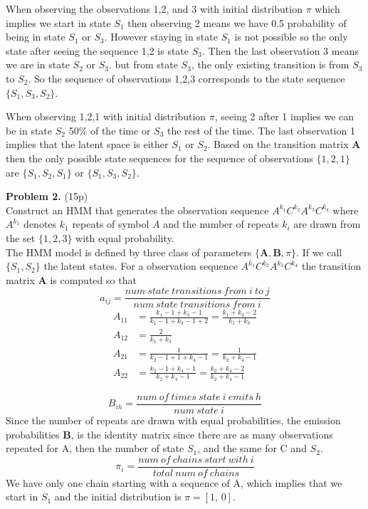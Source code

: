 \documentclass[12pt]{article}
\newcommand{\matr}[1]{\bm{#1}}
\begin{document}
When observing the observations 1,2, and 3 with initial distribution $\pi$ which implies we start in state $S_1$ then observing 2 means we have 0.5 probability of being in state $S_1$ or $S_3$.
However staying in state $S_1$ is not possible so the only state after seeing the sequence 1,2 is state $S_3$. Then the last observation 3 means we are in state $S_2$ or $S_3$. but from state $S_3$, 
the only existing transition is from $S_3$ to $S_2$. So the sequence of observations 1,2,3 corresponds to the state sequence $\{S_1, S_3, S_2 \}$.

When observing 1,2,1 with initial distribution $\pi$, seeing 2 after 1 implies we can be in state $S_2$ 50\% of the time or $S_3$ the rest of the time. The last observation 1 implies that the latent space is either $S_1$ or $S_2$.
Based on the transition matrix $\matr{A}$ then the only possible state sequences for the sequence of observations $\{1,2,1\}$ are $\{S_1, S_2, S_1\}$ or  $\{S_1, S_3, S_2\}$.

\noindent \textbf{Problem 2.} (15p)\\
Construct an HMM that generates the observation sequence $A^{k_1}C^{k_2}A^{k_3}C^{k_4}$ where $A^{k_1}$ denotes $k_1$ repeats of symbol $A$ and the number of repeats $k_i$ are drawn from the set $\{1,2,3\}$ with equal probability.\\

The HMM model is defined by three class of parameters $\{\matr{A}, \matr{B}, \pi \}$.
If we call $\{S_1, S_2\}$ the latent states.  For a observation sequence $A^{k_1}C^{k_2}A^{k_3}C^{k_4}$ the transition matrix $\matr{A}$ is computed so that $$a_{ij} = \frac{num\ state\ transitions\ from\ i\ to\ j}{num\ state\ transitions\ from\ i}$$
\begin{align*}
	A_{11} &= \frac{k_1 -1 + k_3 -1} {k_1-1 + k_3-1 +2} = \frac{k_1 + k_3 -2} {k_1 + k_3} \\
	A_{12} &= \frac{2}{k_1 + k_3} \\
	A_{21} &= \frac{1}{k_2-1 + 1 + k_4-1} = \frac{1} {k_2 + k_4 -1}\\
	A_{22} &= \frac{k_2-1 + k_4-1}{k_2 + k_4 -1} = \frac{k_2 + k_4 -2} {k_2 + k_4 -1}
\end{align*}

$$B_{ih}=\frac{num\ of\ times\ state\ i\ emits\ h}{num\ state\ i}$$
Since the number of repeats are drawn with equal probabilities, the emission probabilities $\matr{B}$, is the identity matrix since there are as many observations repeated for A,
then the number of state $S_1$, and the same for C and $S_2$.
$$\pi_{i}=\frac{num\ of\ chains\ start\ with\ i}{total\ num\ of\ chains}$$
We have only one chain starting with a sequence of A, which implies that we start in $S_1$ and  the initial distribution is $\pi = [1, \, 0]$.
\end{document}

